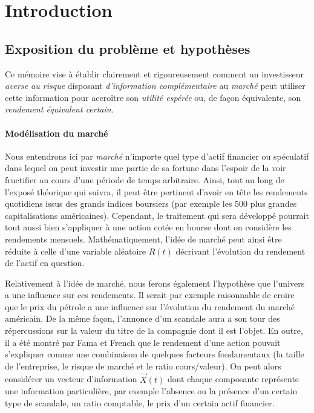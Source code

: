 \section{Introduction}

\subsection{Exposition du problème et hypothèses}

Ce mémoire vise à établir clairement et rigoureusement comment un investisseur
\textit{averse au risque} disposant \textit{d'information complémentaire} au
\textit{marché} peut utiliser cette information pour accroître son \textit{utilité
  espérée} ou, de façon équivalente, son \textit{rendement équivalent certain}.

\paragraph{Modélisation du marché}

Nous entendrons ici par \textit{marché} n'importe quel type d'actif financier ou
spéculatif dans lequel on peut investir une partie de sa fortune dans l'espoir de la voir
fructifier au cours d'une période de temps arbitraire. Ainsi, tout au long de l'exposé
théorique qui suivra, il peut être pertinent d'avoir en tête les rendements quotidiens
issus des grands indices boursiers (par exemple les 500 plus grandes capitalisations
américaines). Cependant, le traitement qui sera développé pourrait tout aussi bien
s'appliquer à une action cotée en bourse dont on considère les rendements mensuels.\nec
Mathématiquement, l'idée de marché peut ainsi être réduite à celle d'une variable
aléatoire $R(t)$ décrivant l'évolution du rendement de l'actif en question.

Relativement à l'idée de marché, nous ferons également l'hypothèse que l'univers a une
influence sur ces rendements. Il serait par exemple raisonnable de croire que le prix du
pétrole a une influence sur l'évolution du rendement du marché américain. De la même
façon, l'annonce d'un scandale aura a son tour des répercussions sur la valeur du titre de
la compagnie dont il est l'objet. En outre, il a été montré par Fama et French que le
rendement d'une action pouvait s'expliquer comme une combinaison de quelques facteurs
fondamentaux (la taille de l'entreprise, le risque de marché et le ratio cours/valeur). On
peut alors considérer un vecteur d'information $\vec X(t)$ dont chaque composante
représente une information particulière, par exemple l'absence ou la présence d'un certain
type de scandale, un ratio comptable, le prix d'un certain actif financier\reph. 

